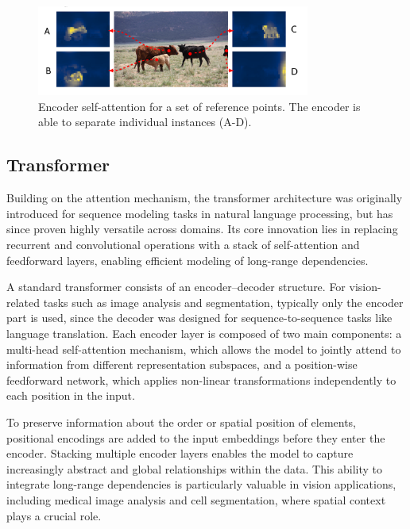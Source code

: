 \begin{figure}[!ht]
    \centering
    \includegraphics[width=0.8\textwidth]{Images/SOTA/attention.png}
    \caption{Encoder self-attention for a set of reference points. The encoder is able to separate individual instances (A-D). }
    \label{fig:attention}
\end{figure}

\subsection{Transformer}

Building on the attention mechanism, the transformer architecture was originally introduced for sequence modeling tasks in natural language processing, but has since proven highly versatile across domains. Its core innovation lies in replacing recurrent and convolutional operations with a stack of self-attention and feedforward layers, enabling efficient modeling of long-range dependencies.

A standard transformer consists of an encoder–decoder structure. For vision-related tasks such as image analysis and segmentation, typically only the encoder part is used, since the decoder was designed for sequence-to-sequence tasks like language translation. Each encoder layer is composed of two main components: a multi-head self-attention mechanism, which allows the model to jointly attend to information from different representation subspaces, and a position-wise feedforward network, which applies non-linear transformations independently to each position in the input.

To preserve information about the order or spatial position of elements, positional encodings are added to the input embeddings before they enter the encoder. Stacking multiple encoder layers enables the model to capture increasingly abstract and global relationships within the data. This ability to integrate long-range dependencies is particularly valuable in vision applications, including medical image analysis and cell segmentation, where spatial context plays a crucial role.

